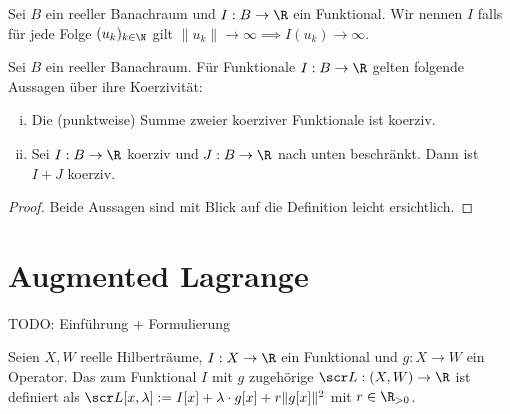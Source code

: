 \documentclass{mythesis}
\begin{document}
\begin{definition} \label{definition:coercive_functional}
    Sei $B$ ein reeller Banachraum und $I: B \to \R$ ein Funktional.
    Wir nennen $I$
    falls für jede Folge $(u_k)_{k\in\N}$ gilt
    \begin{math}
	\|u_k\| \to \infty \implies I(u_k) \to \infty.
    \end{math}
\end{definition}

\begin{proposition} \label{proposition:coercivity}
    Sei $B$ ein reeller Banachraum.
    Für Funktionale $I: B \to \R$ gelten folgende Aussagen über ihre Koerzivität:
    \begin{enumerate}[i)]
        \item
	   Die (punktweise) Summe zweier koerziver Funktionale ist koerziv.
       \item
	   Sei $I: B \to \R$ koerziv und $J: B \to \R$ nach unten beschränkt.
	   Dann ist $I + J$ koerziv.
    \end{enumerate}
    \begin{proof}
	Beide Aussagen sind mit Blick auf die Definition leicht ersichtlich.
    \end{proof}
\end{proposition}



\section{Augmented Lagrange}

TODO: Einführung + Formulierung


\begin{definition} \label{definition:al_functional}
    Seien $X, W$ reelle Hilberträume, $I: X \to \R$ ein Funktional und $g: X \to W$ ein Operator.
    Das zum Funktional $I$ mit  $g$ zugehörige  $\scr L: (X,W) \to \R$
    ist definiert als
    \begin{math}
	\scr L[x,\lambda] := I[x] + \lambda \cdot g[x] + r \|g[x]\|^2
    \end{math}
    mit  $r \in \R_{>0}$.
\end{definition}
\end{document}

